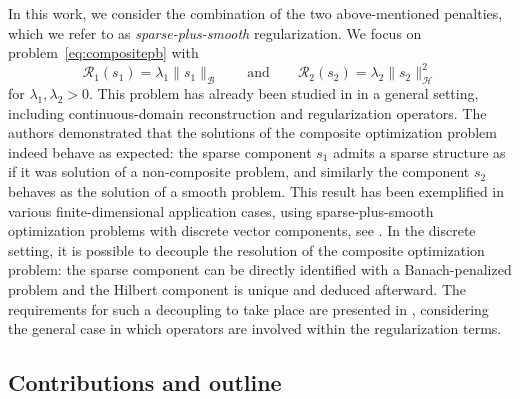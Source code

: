 \documentclass[12pt]{article}
\begin{document}
    In this work, we consider the combination of the two above-mentioned penalties, which we refer to as \emph{sparse-plus-smooth} regularization. We focus on problem~\eqref{eq:compositepb} with
        \begin{equation*}
        \mathcal{R}_1 (s_1) = \lambda_1 \| s_1 \|_{\mathcal{B}} \qquad\text{and}\qquad \mathcal{R}_2 (s_2) = \lambda_2 \| s_2 \|_{\mathcal{H}}^2
    \end{equation*}
    for $\lambda_1, \lambda_2 > 0$. This problem has already been studied in \cite{debarre2021continuous} in a general setting, including continuous-domain reconstruction and regularization operators. The authors demonstrated that the solutions of the composite optimization problem indeed behave as expected: the sparse component $s_1$ admits a sparse structure as if it was solution of a non-composite problem, and similarly the component $s_2$ behaves as the solution of a smooth problem. This result has been exemplified in various finite-dimensional application cases, using sparse-plus-smooth optimization problems with discrete vector components, see \cite{mol2004,gholami2013balanced,debarnot2020learning}. In the discrete setting, it is possible to decouple the resolution of the composite optimization problem: the sparse component can be directly identified with a Banach-penalized problem and the Hilbert component is unique and deduced afterward. The requirements for such a decoupling to take place are presented in \cite{jarret2024decoupled}, considering the general case in which operators are involved within the regularization terms.



    \subsection{Contributions and outline}
\end{document}
